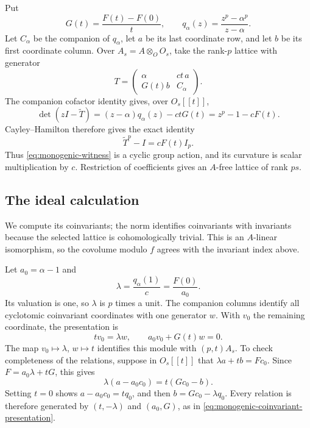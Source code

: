 Put
\[
 G(t)=\frac{F(t)-F(0)}t,\qquad
 q_\alpha(z)=\frac{z^p-\alpha^p}{z-\alpha}.
\]
Let $C_\alpha$ be the companion of $q_\alpha$, let $a$ be its last
coordinate row, and let $b$ be its first coordinate column.  Over
$A_s=A\otimes_O O_s$, take the rank-$p$ lattice with generator
\begin{equation}\label{eq:monogenic-witness}
 T=\begin{pmatrix}
       \alpha&ct\,a\\
       G(t)b&C_\alpha
    \end{pmatrix}.
\end{equation}
The companion cofactor identity gives, over $O_s[[t]]$,
\[
 \det(zI-\widetilde T)
   =(z-\alpha)q_\alpha(z)-ctG(t)
   =z^p-1-cF(t).
\]
Cayley--Hamilton therefore gives the exact identity
\begin{equation}\label{eq:monogenic-exact-curvature}
 \widetilde T^p-I=cF(t)I_p.
\end{equation}
Thus \eqref{eq:monogenic-witness} is a cyclic group action, and its
curvature is scalar multiplication by $c$.  Restriction of coefficients
gives an $A$-free lattice of rank $ps$.

\subsection{The ideal calculation}

We compute its coinvariants; the norm identifies coinvariants with
invariants because the selected lattice is cohomologically trivial.
This is an $A$-linear isomorphism, so the covolume modulo $f$ agrees
with the invariant index above.

Let $a_0=\alpha-1$ and
\[
 \lambda=\frac{q_\alpha(1)}c=\frac{F(0)}{a_0}.
\]
Its valuation is one, so $\lambda$ is $p$ times a unit.  The companion
columns identify all cyclotomic coinvariant coordinates with one
generator $w$.  With $v_0$ the remaining coordinate, the presentation
is
\begin{equation}\label{eq:monogenic-coinvariant-presentation}
 tv_0=\lambda w,\qquad a_0v_0+G(t)w=0.
\end{equation}
The map $v_0\mapsto\lambda$, $w\mapsto t$ identifies this module
with $(p,t)A_s$.  To check completeness of the relations, suppose in
$O_s[[t]]$ that $\lambda a+tb=Fc_0$.  Since
$F=a_0\lambda+tG$, this gives
\[
 \lambda(a-a_0c_0)=t(Gc_0-b).
\]
Setting $t=0$ shows $a-a_0c_0=tq_0$, and then
$b=Gc_0-\lambda q_0$.  Every relation is therefore generated by
$(t,-\lambda)$ and $(a_0,G)$, as in
\eqref{eq:monogenic-coinvariant-presentation}.

